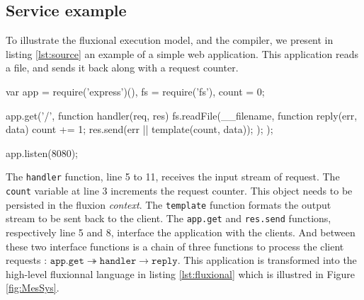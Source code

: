 
\subsection{Service example}

To illustrate the fluxional execution model, and the compiler, we present in listing \ref{lst:source} an example of a simple web application.
This application reads a file, and sends it back along with a request counter.

\begin{code}[js,
  caption={Example web application},
  label={lst:source}]
var app = require('express')(),
    fs = require('fs'),
    count = 0;

app.get('/', function handler(req, res){
  fs.readFile(__filename, function reply(err, data) {
    count += 1;
    res.send(err || template(count, data));
  });
});

app.listen(8080);
\end{code}

The \texttt{handler} function, line 5 to 11, receives the input stream of request.
The \texttt{count} variable at line 3 increments the request counter.
This object needs to be persisted in the fluxion \textit{context}.
The \texttt{template} function formats the output stream to be sent back to the client.
The \texttt{app.get} and \texttt{res.send} functions, respectively line 5 and 8, interface the application with the clients.
And between these two interface functions is a chain of three functions to process the client requests : $\texttt{app.get} \twoheadrightarrow \texttt{handler} \to \texttt{reply}$.
This application is transformed into the high-level fluxionnal language in listing \ref{lst:fluxional} which is illustred in Figure \ref{fig:MesSys}.

